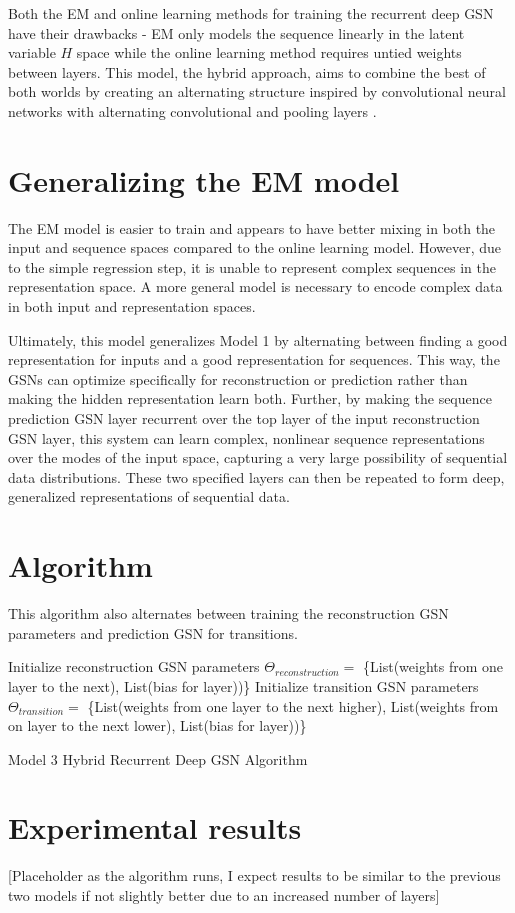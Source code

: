 Both the EM and online learning methods for training the recurrent deep GSN have their drawbacks - EM only models the sequence linearly in the latent variable \(H\) space while the online learning method requires untied weights between layers. This model, the hybrid approach, aims to combine the best of both worlds by creating an alternating structure inspired by convolutional neural networks with alternating convolutional and pooling layers \cite{lenet5}.

\section{Generalizing the EM model}
The EM model is easier to train and appears to have better mixing in both the input and sequence spaces compared to the online learning model. However, due to the simple regression step, it is unable to represent complex sequences in the representation space. A more general model is necessary to encode complex data in both input and representation spaces.

Ultimately, this model generalizes Model 1 by alternating between finding a good representation for inputs and a good representation for sequences. This way, the GSNs can optimize specifically for reconstruction or prediction rather than making the hidden representation learn both. Further, by making the sequence prediction GSN layer recurrent over the top layer of the input reconstruction GSN layer, this system can learn complex, nonlinear sequence representations over the modes of the input space, capturing a very large possibility of sequential data distributions. These two specified layers can then be repeated to form deep, generalized representations of sequential data.


\section{Algorithm}
This algorithm also alternates between training the reconstruction GSN parameters and prediction GSN for transitions.
 \begin{algorithm}[h!]
	Initialize reconstruction GSN parameters \(\Theta_{reconstruction} = \) \{List(weights from one layer to the next), List(bias for layer))\}\;
	Initialize transition GSN parameters \(\Theta_{transition} = \) \{List(weights from one layer to the next higher), List(weights from on layer to the next lower), List(bias for layer))\}\;
	\caption{ Model 3 Hybrid  Recurrent Deep GSN Algorithm }
\end{algorithm}


\section{Experimental results}
[Placeholder as the algorithm runs, I expect results to be similar to the previous two models if not slightly better due to an increased number of layers]